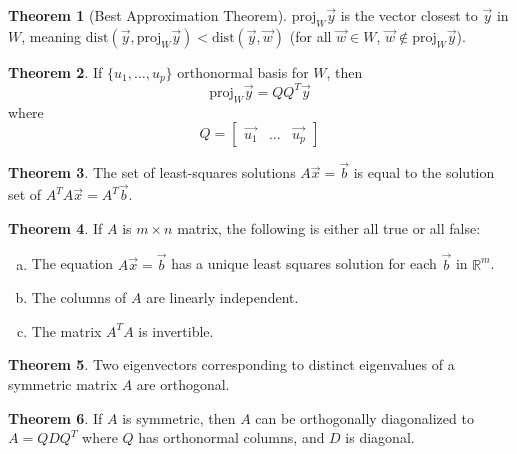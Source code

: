 \documentclass[a4paper,12pt]{article}
\theoremstyle{definition}
\newtheorem{theorem}{Theorem}
\theoremstyle{definition}
\newcommand{\mateq}[3]{#1#2 = #3}
\newcommand{\mateqaxb}{\mateq{A}{\vec{x}}{\vec{b}}}
\newcommand{\finitevecs}[2]{#1_1,\ldots,#1_#2}
\newcommand{\finitevecsset}[2]{\{\finitevecs{#1}{#2}\}}
\newcommand{\normaleq}{A^TA\vec{x} = A^T\vec{b}}
\begin{document}
	\begin{theorem}[Best Approximation Theorem]
		\label{thm:best-approx-thm}
		$\text{proj}_W\vec{y}$ is the vector closest to $\vec{y}$ in $W$, meaning $\text{dist}(\vec{y}, \text{proj}_W\vec{y}) < \text{dist}(\vec{y}, \vec{w})$ (for all $\vec{w} \in W$, $\vec{w} \notin \text{proj}_W\vec{y}$).
	\end{theorem}
	
	\begin{theorem}
		\label{thm:orthonormal-basis-proj-thm}
		If $\finitevecsset{u}{p}$ orthonormal basis for $W$, then \begin{equation*}
			\text{proj}_W\vec{y} = QQ^T\vec{y}
		\end{equation*}
		where
		\begin{equation*}
			Q =
			\begin{bmatrix}
				\vec{u_1} & \ldots & \vec{u_p}
			\end{bmatrix}
		\end{equation*}
	\end{theorem}
	
	\begin{theorem}
		\label{thm:least-squares-soln-set-thm}
		The set of least-squares solutions $\mateqaxb$ is equal to the solution set of $\normaleq$.
	\end{theorem}
	
	\begin{theorem}
		\label{thm:least-squares-logical-equivalences}
		If $A$ is $m \times n$ matrix, the following is either all true or all false:
		\begin{enumerate}[a.]
			\item The equation $\mateqaxb$ has a unique least squares solution for each $\vec{b}$ in $\mathbb{R}^m$.
			
			\item The columns of $A$ are linearly independent.
			
			\item The matrix $A^TA$ is invertible.
		\end{enumerate}
	\end{theorem}
	
	\begin{theorem}
		\label{thm:symmetrix-mat-eigenvals-and-vecs-thm}
		Two eigenvectors corresponding to distinct eigenvalues of a symmetric matrix $A$ are orthogonal.
	\end{theorem}
	
	\begin{theorem}
		\label{thm:symmetric-mat-diagonlizability-thm}
		If $A$ is symmetric, then $A$ can be orthogonally diagonalized to $A = QDQ^T$ where $Q$ has orthonormal columns, and $D$ is diagonal.
	\end{theorem}
	\newpage
	
\end{document}
